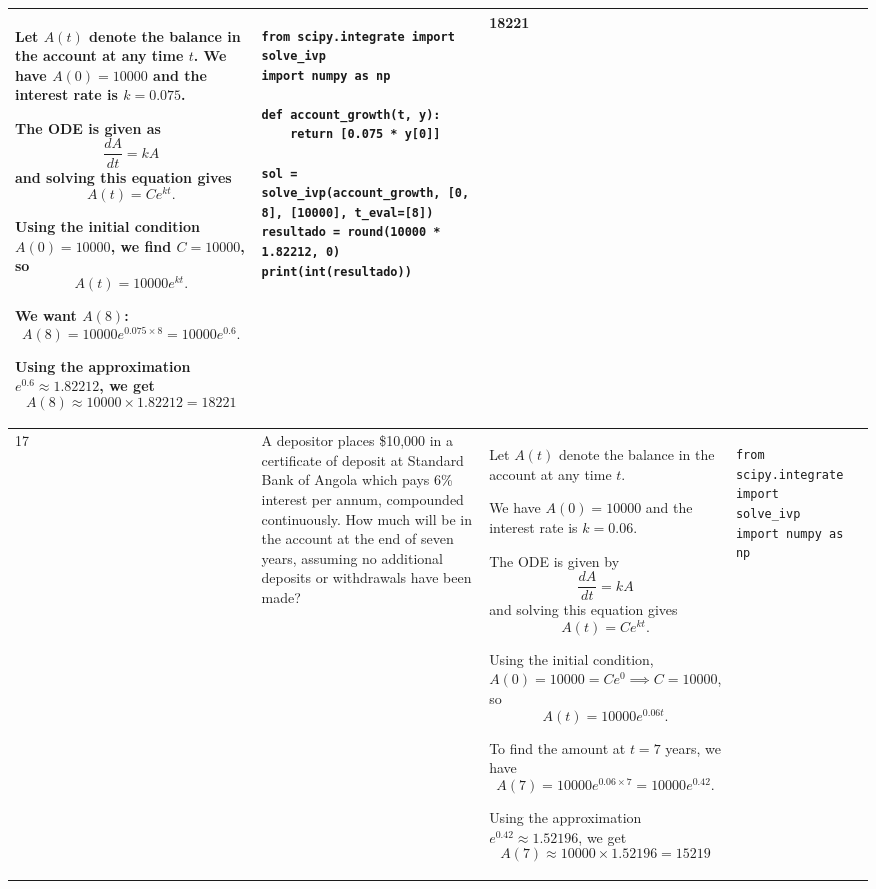 \documentclass[a4paper,12pt]{article}
\begin{document}
\begin{longtable}{|p{0.3cm}|p{}|p{10cm}|p{}|p{1.5cm}|}
Let \( A(t) \) denote the balance in the account at any time \( t \). We have \( A(0) = 10000 \) and the interest rate is \( k = 0.075 \).

The ODE is given as
\[
\frac{dA}{dt} = kA
\]
and solving this equation gives
\[
A(t) = C e^{kt}.
\]

Using the initial condition \( A(0) = 10000 \), we find \( C = 10000 \), so
\[
A(t) = 10000 e^{kt}.
\]

We want \( A(8) \):
\[
A(8) = 10000 e^{0.075 \times 8} = 10000 e^{0.6}.
\]

Using the approximation \( e^{0.6} \approx 1.82212 \), we get
\[
A(8) \approx 10000 \times 1.82212 = 18221
\]



          &\begin{verbatim}
from scipy.integrate import solve_ivp
import numpy as np

def account_growth(t, y):
    return [0.075 * y[0]]

sol = solve_ivp(account_growth, [0, 8], [10000], t_eval=[8])
resultado = round(10000 * 1.82212, 0)
print(int(resultado))\end{verbatim} &  18221              \\ \hline
      17           &  A depositor places \$10,000 in a certificate of deposit at Standard Bank of Angola which pays 6\% interest per annum, compounded continuously. How much will be in the account at the end of seven years, assuming no additional deposits or withdrawals have been made?        &   




Let \( A(t) \) denote the balance in the account at any time \( t \).

We have \( A(0) = 10000 \) and the interest rate is \( k = 0.06 \).

The ODE is given by
\[
\frac{dA}{dt} = kA
\]
and solving this equation gives
\[
A(t) = Ce^{kt}.
\]

Using the initial condition, \( A(0) = 10000 = Ce^{0} \implies C = 10000 \), so
\[
A(t) = 10000e^{0.06t}.
\]

To find the amount at \( t = 7 \) years, we have
\[
A(7) = 10000e^{0.06 \times 7} = 10000e^{0.42}.
\]

Using the approximation \( e^{0.42} \approx 1.52196 \), we get
\[
A(7) \approx 10000 \times 1.52196 = 15219
\]



         & \begin{verbatim}
from scipy.integrate import solve_ivp
import numpy as np


\end{verbatim}
\end{longtable}
\end{document}

